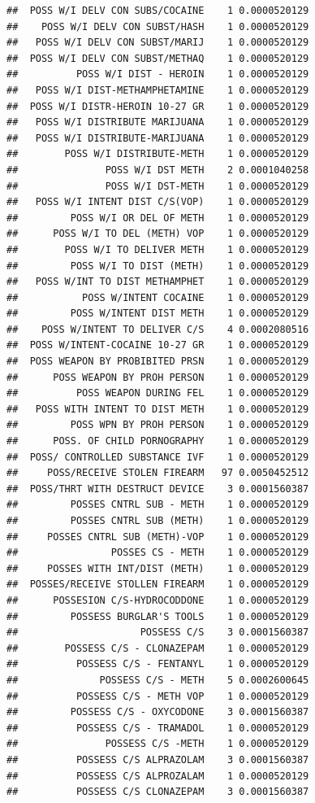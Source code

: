 \documentclass[]{book}
\begin{document}
\begin{verbatim}
##  POSS W/I DELV CON SUBS/COCAINE    1 0.0000520129
##    POSS W/I DELV CON SUBST/HASH    1 0.0000520129
##   POSS W/I DELV CON SUBST/MARIJ    1 0.0000520129
##  POSS W/I DELV CON SUBST/METHAQ    1 0.0000520129
##          POSS W/I DIST - HEROIN    1 0.0000520129
##   POSS W/I DIST-METHAMPHETAMINE    1 0.0000520129
##  POSS W/I DISTR-HEROIN 10-27 GR    1 0.0000520129
##   POSS W/I DISTRIBUTE MARIJUANA    1 0.0000520129
##   POSS W/I DISTRIBUTE-MARIJUANA    1 0.0000520129
##        POSS W/I DISTRIBUTE-METH    1 0.0000520129
##               POSS W/I DST METH    2 0.0001040258
##               POSS W/I DST-METH    1 0.0000520129
##   POSS W/I INTENT DIST C/S(VOP)    1 0.0000520129
##         POSS W/I OR DEL OF METH    1 0.0000520129
##      POSS W/I TO DEL (METH) VOP    1 0.0000520129
##        POSS W/I TO DELIVER METH    1 0.0000520129
##         POSS W/I TO DIST (METH)    1 0.0000520129
##   POSS W/INT TO DIST METHAMPHET    1 0.0000520129
##           POSS W/INTENT COCAINE    1 0.0000520129
##         POSS W/INTENT DIST METH    1 0.0000520129
##    POSS W/INTENT TO DELIVER C/S    4 0.0002080516
##  POSS W/INTENT-COCAINE 10-27 GR    1 0.0000520129
##  POSS WEAPON BY PROBIBITED PRSN    1 0.0000520129
##      POSS WEAPON BY PROH PERSON    1 0.0000520129
##          POSS WEAPON DURING FEL    1 0.0000520129
##   POSS WITH INTENT TO DIST METH    1 0.0000520129
##         POSS WPN BY PROH PERSON    1 0.0000520129
##      POSS. OF CHILD PORNOGRAPHY    1 0.0000520129
##  POSS/ CONTROLLED SUBSTANCE IVF    1 0.0000520129
##     POSS/RECEIVE STOLEN FIREARM   97 0.0050452512
##  POSS/THRT WITH DESTRUCT DEVICE    3 0.0001560387
##         POSSES CNTRL SUB - METH    1 0.0000520129
##         POSSES CNTRL SUB (METH)    1 0.0000520129
##     POSSES CNTRL SUB (METH)-VOP    1 0.0000520129
##                POSSES CS - METH    1 0.0000520129
##     POSSES WITH INT/DIST (METH)    1 0.0000520129
##  POSSES/RECEIVE STOLLEN FIREARM    1 0.0000520129
##      POSSESION C/S-HYDROCODDONE    1 0.0000520129
##         POSSESS BURGLAR'S TOOLS    1 0.0000520129
##                     POSSESS C/S    3 0.0001560387
##        POSSESS C/S - CLONAZEPAM    1 0.0000520129
##          POSSESS C/S - FENTANYL    1 0.0000520129
##              POSSESS C/S - METH    5 0.0002600645
##          POSSESS C/S - METH VOP    1 0.0000520129
##         POSSESS C/S - OXYCODONE    3 0.0001560387
##          POSSESS C/S - TRAMADOL    1 0.0000520129
##               POSSESS C/S -METH    1 0.0000520129
##          POSSESS C/S ALPRAZOLAM    3 0.0001560387
##          POSSESS C/S ALPROZALAM    1 0.0000520129
##          POSSESS C/S CLONAZEPAM    3 0.0001560387

\end{verbatim}
\end{document}
